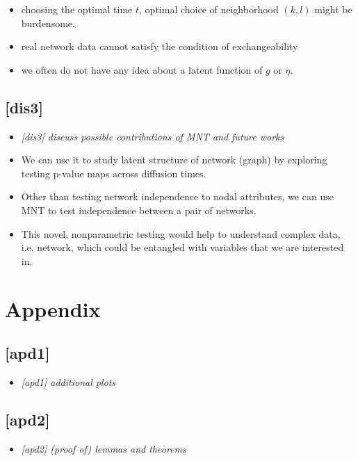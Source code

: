 \documentclass[12pt]{article}
\theoremstyle{definition}
\begin{document}
\begin{itemize}
	\item choosing the optimal time $t$, optimal choice of neighborhood $(k,l)$ might be burdensome. 
	\item real network data cannot satisfy the condition of exchangeability
	\item we often do not have any idea about a latent function of $g$ or $\eta$.
\end{itemize}	



\subsection{[dis3]}
\begin{itemize}
	\item {\it  [dis3] discuss possible contributions of MNT and future works  \/}
\end{itemize}

\begin{itemize}
	\item We can use it to study latent structure of network (graph) by exploring testing p-value maps across diffusion times.
	\item Other than testing network independence to nodal attributes, we can use MNT to test independence between a pair of networks.  
	\item This novel, nonparametric testing would help to understand complex data, i.e. network, which could be entangled with variables that we are interested in. 
\end{itemize}	









\newpage
\section{Appendix}

\subsection{[apd1]}
\begin{itemize}
	\item {\it  [apd1] additional plots   \/}
\end{itemize}


\subsection{[apd2]}
\begin{itemize}
	\item {\it  [apd2] (proof of) lemmas and theorems   \/}
\end{itemize}
\end{document}
